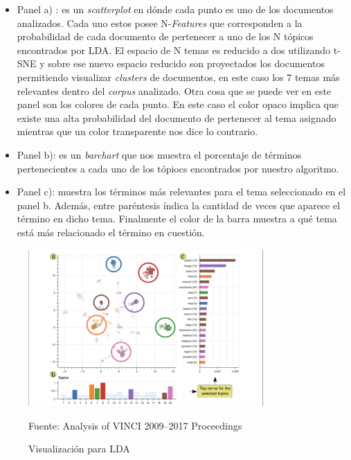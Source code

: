     \begin{itemize}
        \item Panel a) : es un \textit{scatterplot} en dónde cada punto es uno de los documentos analizados. Cada uno estos posee N-\textit{Features} que corresponden a la probabilidad de cada documento de pertenecer a uno de los N tópicos encontrados por LDA. El espacio de N temas es reducido a dos utilizando t-SNE y sobre ese nuevo espacio reducido son proyectados los documentos permitiendo visualizar \textit{clusters} de documentos, en este caso los 7 temas más relevantes dentro del \textit{corpus} analizado. Otra cosa que se puede ver en este panel son los colores de cada punto. En este caso el color opaco implica que existe una alta probabilidad del documento de pertenecer al tema asignado mientras que un color transparente nos dice lo contrario.
        
        \item Panel b): es un \textit{barchart} que nos muestra el porcentaje de términos pertenecientes a cada uno de los tópiocs encontrados por nuestro algoritmo.
        
        \item Panel c): muestra los términos más relevantes para el tema seleccionado en el panel b. Además, entre paréntesis índica la cantidad de veces que aparece el término en dicho tema. Finalmente el color de la barra muestra a qué tema está más relacionado el término en cuestión.
    \end{itemize}
    
    \begin{figure}[H]
        \centering
        \includegraphics[width=0.8\textwidth]{figures/AnalisisVinci.png}
        \caption{\label{fig:Vinci} Visualización para LDA} Fuente: Analysis of VINCI 2009–2017 Proceedings \cite{kucher2018analysis}
    \end{figure}
    
